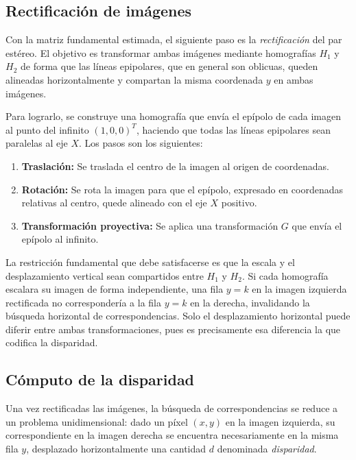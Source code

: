 \documentclass[
10pt, %
a4paper, %
oneside, %
headinclude,footinclude, %
BCOR=5mm, %
]{scrartcl}
\begin{document}
\subsection{Rectificación de imágenes}

Con la matriz fundamental estimada, el siguiente paso es la
\textit{rectificación} del par estéreo. El objetivo es transformar
ambas imágenes mediante homografías $H_1$ y $H_2$ de forma que las
líneas epipolares, que en general son oblicuas, queden alineadas
horizontalmente y compartan la misma coordenada $y$ en ambas imágenes.

Para lograrlo, se construye una homografía que envía el
epípolo de cada imagen al punto del infinito $(1, 0, 0)^T$, haciendo
que todas las líneas epipolares sean paralelas al eje $X$. Los pasos
son los siguientes:

\begin{enumerate}
    \item \textbf{Traslación:} Se traslada el centro de la imagen al origen de coordenadas.
    \item \textbf{Rotación:} Se rota la imagen para que el epípolo, expresado en coordenadas relativas al centro, quede alineado con el eje $X$ positivo.
    \item \textbf{Transformación proyectiva:} Se aplica una transformación $G$ que envía el epípolo al infinito.
\end{enumerate}

La restricción fundamental que debe satisfacerse es que la escala y
el desplazamiento vertical sean compartidos entre $H_1$ y
$H_2$. Si cada homografía escalara su imagen de forma independiente,
una fila $y = k$ en la imagen izquierda rectificada no correspondería
a la fila $y = k$ en la derecha, invalidando la búsqueda horizontal
de correspondencias. Solo el desplazamiento horizontal puede diferir
entre ambas transformaciones, pues es precisamente esa diferencia la
que codifica la disparidad.

\subsection{Cómputo de la disparidad}

Una vez rectificadas las imágenes, la búsqueda de correspondencias
se reduce a un problema unidimensional: dado un píxel $(x, y)$ en
la imagen izquierda, su correspondiente en la imagen derecha se
encuentra necesariamente en la misma fila $y$, desplazado
horizontalmente una cantidad $d$ denominada \textit{disparidad}.
\end{document}
